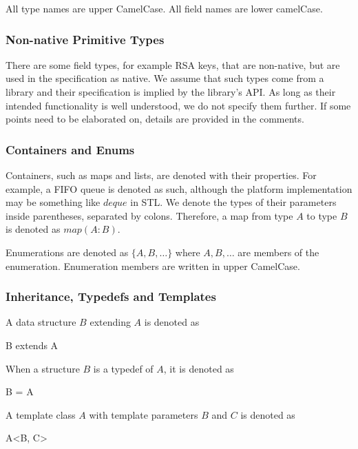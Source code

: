 \documentclass[a4paper,10pt,draft]{article}
\begin{document}
All type names are upper CamelCase. All field names are lower camelCase.

\subsubsection{Non-native Primitive Types}
There are some field types, for example RSA keys, that are non-native, but are used in the specification as native. We assume that such types come from a library and their 
specification is implied by the library's API. As long as their intended functionality is well understood, we do not specify them further. If some points need to be elaborated on, 
details are provided in the comments.

\subsubsection{Containers and Enums}
Containers, such as maps and lists, are denoted with their properties. For example, a FIFO queue is denoted as such, although the platform implementation may be something like 
$deque$ in STL. We denote the types of their parameters inside parentheses, separated by colons. Therefore, a map from type $A$ to type $B$ is denoted as $map(A:B)$.

Enumerations are denoted as $\{ A, B, \dots \}$ where $A, B, \dots$ are members of the enumeration. Enumeration members are written in upper CamelCase.

\subsubsection{Inheritance, Typedefs and Templates}
A data structure $B$ extending $A$ is denoted as

\begin{verbbox}
B extends A
\end{verbbox}
\begin{center}
\theverbbox
\end{center}

When a structure $B$ is a typedef of $A$, it is denoted as

\begin{verbbox}
B = A
\end{verbbox}
\begin{center}
\theverbbox
\end{center}

A template class $A$ with template parameters $B$ and $C$ is denoted as

\begin{verbbox}
A<B, C>
\end{verbbox}
\begin{center}
\theverbbox
\end{center}
\end{document}
